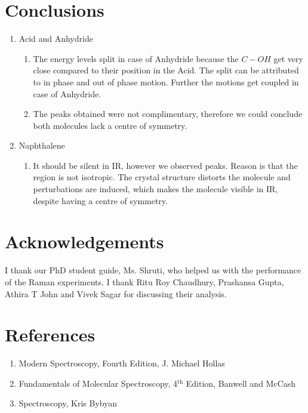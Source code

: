 \section{Conclusions}
	\begin{enumerate}
		\item Acid and Anhydride
			\begin{enumerate}
				\item The energy levels split in case of Anhydride because the $C-OH$ get very close compared to their position in the Acid. The split can be attributed to in phase and out of phase motion. Further the motions get coupled in case of Anhydride.
				\item The peaks obtained were not complimentary, therefore we could conclude both molecules lack a centre of symmetry. 
			\end{enumerate}
		\item Naphthalene
			\begin{enumerate}
				\item It should be silent in IR, however we observed peaks. Reason is that the region is not isotropic. The crystal structure distorts the molecule and perturbations are induced, which makes the molecule visible in IR, despite having a centre of symmetry.
			\end{enumerate}
	\end{enumerate}

\section{Acknowledgements}
I thank our PhD student guide, Ms. Shruti, who helped us with the performance of the Raman experiments. I thank Ritu Roy Chaudhury, Prashansa Gupta, Athira T John and Vivek Sagar for discussing their analysis.

\section{References}
\begin{enumerate}
	\item Modern Spectroscopy, Fourth Edition, J. Michael Hollas
	\item Fundamentals of Molecular Spectroscopy, 4$^{\text{th}}$ Edition, Banwell and McCash
	\item Spectroscopy, Kris Bybyan
\end{enumerate}